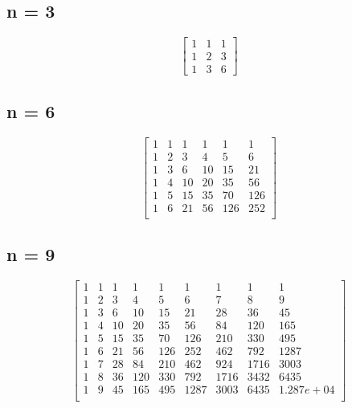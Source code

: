\documentclass[10pt,a4paper,twocolumn]{article}
\begin{document}
\subsection{n = 3}
$$
\begin{bmatrix}
1 & 1  & 1 \\ 
1 & 2 & 3\\ 
1 & 3 & 6
\end{bmatrix}
$$
\subsection{n = 6}
$$
\begin{bmatrix}
1 & 1 & 1 & 1 & 1 & 1 \\
1 & 2 & 3 & 4 & 5 & 6 \\
1 & 3 & 6 & 10 & 15 & 21 \\
1 & 4 & 10 & 20 & 35 & 56 \\
1 & 5 & 15 & 35 & 70 & 126 \\
1 & 6 & 21 & 56 & 126 & 252 \\
\end{bmatrix}
$$
\subsection{n = 9}
$$
\begin{bmatrix}
1 & 1 & 1 & 1 & 1 & 1 & 1 & 1 & 1 \\
1 & 2 & 3 & 4 & 5 & 6 & 7 & 8 & 9 \\
1 & 3 & 6 & 10 & 15 & 21 & 28 & 36 & 45 \\
1 & 4 & 10 & 20 & 35 & 56 & 84 & 120 & 165 \\
1 & 5 & 15 & 35 & 70 & 126 & 210 & 330 & 495 \\
1 & 6 & 21 & 56 & 126 & 252 & 462 & 792 & 1287 \\
1 & 7 & 28 & 84 & 210 & 462 & 924 & 1716 & 3003 \\
1 & 8 & 36 & 120 & 330 & 792 & 1716 & 3432 & 6435 \\
1 & 9 & 45 & 165 & 495 & 1287 & 3003 & 6435 & 1.287e+04 \\
\end{bmatrix}
$$
\end{document}
